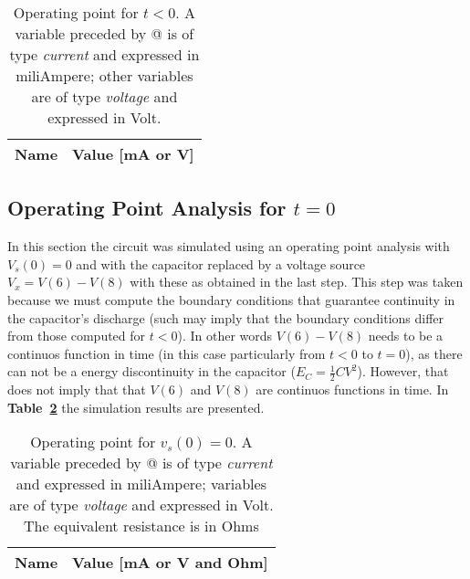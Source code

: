 \begin{table}[h!]
  \centering
  \begin{tabular}{|l|r|}
    \hline    
    {\bf Name} & {\bf Value [mA or V]} \\ \hline
    
  \end{tabular}
  \caption{Operating point for $t<0$. A variable preceded by @ is of type {\em current}
    and expressed in miliAmpere; other variables are of type {\it voltage} and expressed in
    Volt.}
  \label{tab:op}
\end{table}

\pagebreak
\subsection{Operating Point Analysis for $t=0$}
In this section the circuit was simulated using an operating point analysis with $V_s(0) = 0$ and 
with the capacitor replaced by a voltage source {\it $V_x=V(6)-V(8)$} with these as obtained in the last step. This step was taken because we must compute the boundary conditions that guarantee continuity in the capacitor's discharge (such may imply that the boundary conditions differ from those computed for $t<0$). In other words $V(6)-V(8)$ needs to be a continuos function in time (in this case particularly from $t<0$ to $t=0$), as there can not be a energy discontinuity in the capacitor ($E_C=\frac{1}{2}CV^{2}$). However, that does not imply that that $V(6)$ and $V(8)$ are continuos functions in time.
In \textbf{Table~\ref{tab:opeq}} the simulation results are presented. 
\begin{table}[h!]
  \centering
  \begin{tabular}{|l|r|}
    \hline    
    {\bf Name} & {\bf Value [mA or V and Ohm]} \\ \hline
    
  \end{tabular} 
  \caption{Operating point for {\it $v_s(0)=0$}. A variable preceded by @ is of type {\em current}
    and expressed in miliAmpere; variables are of type {\it voltage} and expressed in
    Volt. The equivalent resistance is in Ohms}
  \label{tab:opeq}
\end{table}

\pagebreak
 
